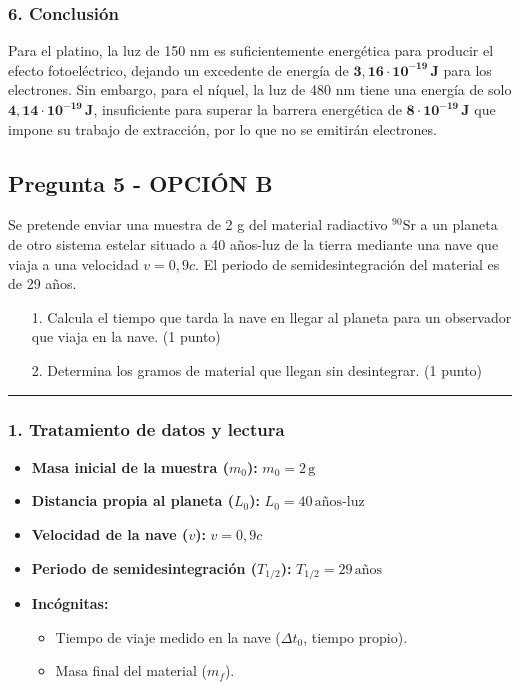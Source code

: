 \subsubsection*{6. Conclusión}
\begin{cajaconclusion}
Para el platino, la luz de 150 nm es suficientemente energética para producir el efecto fotoeléctrico, dejando un excedente de energía de $\mathbf{3,16 \cdot 10^{-19} \, J}$ para los electrones. Sin embargo, para el níquel, la luz de 480 nm tiene una energía de solo $\mathbf{4,14 \cdot 10^{-19} \, J}$, insuficiente para superar la barrera energética de $\mathbf{8 \cdot 10^{-19} \, J}$ que impone su trabajo de extracción, por lo que no se emitirán electrones.
\end{cajaconclusion}

\newpage

\subsection{Pregunta 5 - OPCIÓN B}
\label{subsec:5B_2003_jun_ord}

\begin{cajaenunciado}
Se pretende enviar una muestra de 2 g del material radiactivo ${}^{90}\text{Sr}$ a un planeta de otro sistema estelar situado a 40 años-luz de la tierra mediante una nave que viaja a una velocidad $v=0,9c$. El periodo de semidesintegración del material es de 29 años.
\begin{enumerate}
    \item[1.] Calcula el tiempo que tarda la nave en llegar al planeta para un observador que viaja en la nave. (1 punto)
    \item[2.] Determina los gramos de material que llegan sin desintegrar. (1 punto)
\end{enumerate}
\end{cajaenunciado}
\hrule

\subsubsection*{1. Tratamiento de datos y lectura}
\begin{itemize}
    \item \textbf{Masa inicial de la muestra ($m_0$):} $m_0 = 2 \, \text{g}$
    \item \textbf{Distancia propia al planeta ($L_0$):} $L_0 = 40 \, \text{años-luz}$
    \item \textbf{Velocidad de la nave ($v$):} $v = 0,9c$
    \item \textbf{Periodo de semidesintegración ($T_{1/2}$):} $T_{1/2} = 29 \, \text{años}$
    \item \textbf{Incógnitas:}
        \begin{itemize}
            \item Tiempo de viaje medido en la nave ($\Delta t_0$, tiempo propio).
            \item Masa final del material ($m_f$).
        \end{itemize}
\end{itemize}

